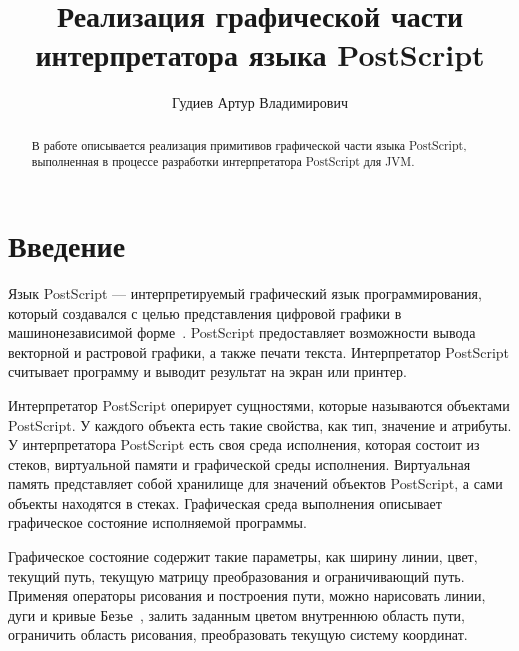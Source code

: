 \title{Реализация графической части\\
интерпретатора языка PostScript}
%
\author{Гудиев Артур Владимирович}
%
%
%

\maketitle

\begin{abstract}
В работе описывается реализация примитивов графической части языка PostScript, выполненная
в процессе разработки интерпретатора PostScript для JVM.
\end{abstract}

\section*{Введение}
 
Язык PostScript --- интерпретируемый графический язык программирования, который создавался с целью представления цифровой графики в машинонезависимой форме~\cite{plrm2}. PostScript предоставляет возможности вывода векторной и растровой графики, а также печати текста. Интерпретатор PostScript считывает программу и выводит результат на экран или принтер. 
  
Интерпретатор PostScript оперирует сущностями, которые называются объектами PostScript. У каждого объекта есть такие свойства, как тип, значение и атрибуты. У интерпретатора PostScript есть своя среда исполнения, которая состоит из стеков, виртуальной памяти и графической среды исполнения. Виртуальная память представляет собой хранилище для значений объектов PostScript, а сами объекты находятся в стеках. Графическая среда выполнения описывает графическое состояние исполняемой программы.

Графическое состояние содержит  такие параметры, как ширину линии,  цвет,  текущий путь, текущую матрицу преобразования и  ограничивающий путь.  Применяя операторы рисования и построения пути, можно нарисовать линии, дуги и кривые Безье~\cite{graphics}, залить заданным цветом внутреннюю область  пути, ограничить область рисования, преобразовать текущую систему координат.


